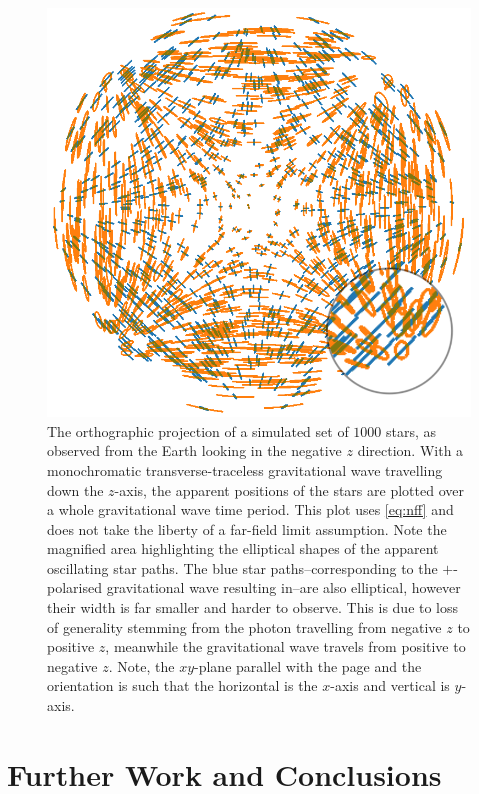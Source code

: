 \begin{figure} 
\centering    
\includegraphics[width=1.0\textwidth]{Chapter4/Figs/Raster/fullstar.png}
\caption{\label{fig:ccc} The orthographic projection of a simulated set of $1000$ stars, as observed from the Earth looking in the negative $z$ direction. With a monochromatic transverse-traceless gravitational wave travelling down the $z$-axis, the apparent positions of the stars are plotted over a whole gravitational wave time period. This plot uses \cref{eq:nff} and does not take the liberty of a far-field limit assumption. Note the magnified area highlighting the elliptical shapes of the apparent oscillating star paths. The blue star paths--corresponding to the $+$-polarised gravitational wave resulting in--are also elliptical, however their width is far smaller and harder to observe. This is due to loss of generality stemming from the photon travelling from negative $z$ to positive $z$, meanwhile the gravitational wave travels from positive to negative $z$. Note, the $xy$-plane parallel with the page and the orientation is such that the horizontal is the $x$-axis and vertical is $y$-axis.}
\end{figure}



\section{Further Work and Conclusions}


